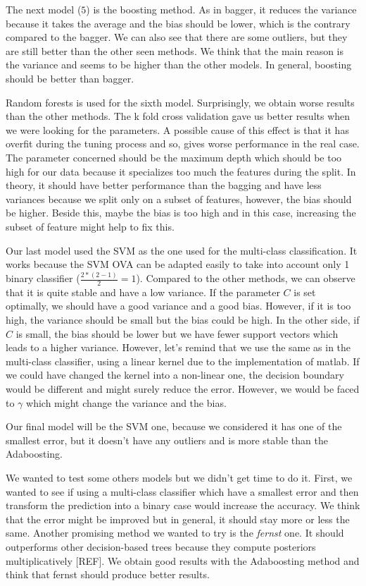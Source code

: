 \documentclass{article} %
\begin{document}
The next model ($5$) is the boosting method. As in bagger, it reduces the variance because it takes the average and the bias should be lower, which is the contrary compared to the bagger. We can also see that there are some outliers, but they are still better than the other seen methods. We think that the main reason is the variance and seems to be higher than the other models. In general, boosting should be better than bagger.

Random forests is used for the sixth model. Surprisingly, we obtain worse results than the other methods. The k fold cross validation gave us better results when we were looking for the parameters. A possible cause of this effect is that it has overfit during the tuning process and so, gives worse performance in the real case. The parameter concerned should be the maximum depth which should be too high for our data because it specializes too much the features during the split. In theory, it should have better performance than the bagging and have less variances because we split only on a subset of features, however, the bias should be higher. Beside this, maybe the bias is too high and in this case, increasing the subset of feature might help to fix this.

Our last model used the SVM as the one used for the multi-class classification. It works because the SVM OVA can be adapted easily to take into account only 1 binary classifier ($\frac{2*(2-1)}{2}=1$). Compared to the other methods, we can observe that it is quite stable and have a low variance. If the parameter $C$ is set optimally, we should have a good variance and a good bias. However, if it is too high, the variance should be small but the bias could be high. In the other side, if $C$ is small, the bias should be lower but we have fewer support vectors which leads to a higher variance. However, let's remind that we use the same as in the multi-class classifier, using a linear kernel due to the implementation of matlab. If we could have changed the kernel into a non-linear one, the decision boundary would be different and might surely reduce the error. However, we would be faced to $\gamma$ which might change the variance and the bias.

Our final model will be the SVM one, because we considered it has one of the smallest error, but it doesn't have any outliers and is more stable than the Adaboosting.

We wanted to test some others models but we didn't get time to do it. First, we wanted to see if using a multi-class classifier which have a smallest error and then transform the prediction into a binary case would increase the accuracy.  We think that the error might be improved but in general, it should stay more or less the same. Another promising method we wanted to try is the \textit{fernst} one. It should outperforms other decision-based trees because they compute posteriors multiplicatively [REF]. We obtain good results with the Adaboosting method and think that fernst should produce better results.
\end{document}
